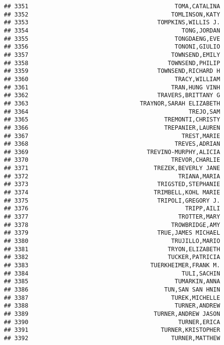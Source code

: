 \documentclass[
]{article}
\begin{document}
\begin{verbatim}
## 3351                                          TOMA,CATALINA
## 3352                                         TOMLINSON,KATY
## 3353                                     TOMPKINS,WILLIS J.
## 3354                                            TONG,JORDAN
## 3355                                          TONGDAENG,EVE
## 3356                                          TONONI,GIULIO
## 3357                                         TOWNSEND,EMILY
## 3358                                        TOWNSEND,PHILIP
## 3359                                     TOWNSEND,RICHARD H
## 3360                                          TRACY,WILLIAM
## 3361                                         TRAN,HUNG VINH
## 3362                                     TRAVERS,BRITTANY G
## 3363                                TRAYNOR,SARAH ELIZABETH
## 3364                                              TREJO,SAM
## 3365                                       TREMONTI,CHRISTY
## 3366                                       TREPANIER,LAUREN
## 3367                                            TREST,MARIE
## 3368                                          TREVES,ADRIAN
## 3369                                  TREVINO-MURPHY,ALICIA
## 3370                                         TREVOR,CHARLIE
## 3371                                    TREZEK,BEVERLY JANE
## 3372                                           TRIANA,MARIA
## 3373                                     TRIGSTED,STEPHANIE
## 3374                                    TRIMBELL,KOHL MARIE
## 3375                                     TRIPOLI,GREGORY J.
## 3376                                             TRIPP,AILI
## 3377                                           TROTTER,MARY
## 3378                                         TROWBRIDGE,AMY
## 3379                                     TRUE,JAMES MICHAEL
## 3380                                         TRUJILLO,MARIO
## 3381                                        TRYON,ELIZABETH
## 3382                                        TUCKER,PATRICIA
## 3383                                   TUERKHEIMER,FRANK M.
## 3384                                            TULI,SACHIN
## 3385                                          TUMARKIN,ANNA
## 3386                                       TUN,SAN SAN HNIN
## 3387                                         TUREK,MICHELLE
## 3388                                          TURNER,ANDREW
## 3389                                    TURNER,ANDREW JASON
## 3390                                           TURNER,ERICA
## 3391                                      TURNER,KRISTOPHER
## 3392                                         TURNER,MATTHEW

\end{verbatim}
\end{document}
